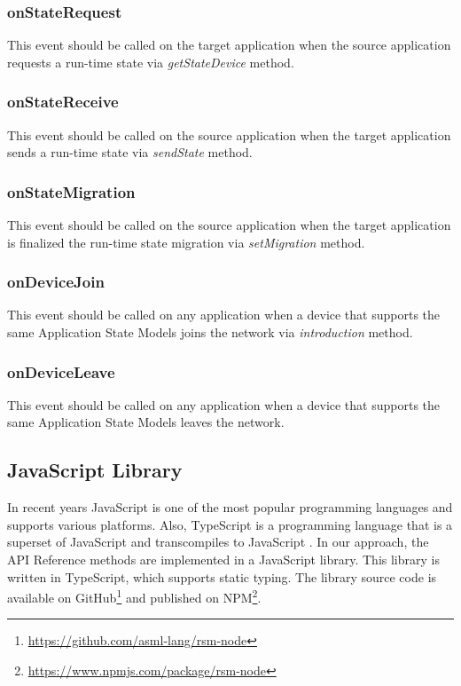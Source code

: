 \subsubsection{onStateRequest}
This event should be called on the target application when the source application requests a run-time state via \textit{getStateDevice} method.

\subsubsection{onStateReceive}
This event should be called on the source application when the target application sends a run-time state via \textit{sendState} method.

\subsubsection{onStateMigration}
This event should be called on the source application when the target application is finalized the run-time state migration via \textit{setMigration} method.

\subsubsection{onDeviceJoin}
This event should be called on any application when a device that supports the same Application State Models joins the network via \textit{introduction} method.

\subsubsection{onDeviceLeave}
This event should be called on any application when a device that supports the same Application State Models leaves the network.


\subsection{JavaScript Library}
In recent years JavaScript is one of the most popular programming languages and supports various platforms. Also, TypeScript is a programming language that is a superset of JavaScript and transcompiles to JavaScript  \cite{typescript}. In our approach, the API Reference methods are implemented in a JavaScript library. This library is written in TypeScript, which supports static typing. The library source code is available on GitHub\footnote{\url{https://github.com/asml-lang/rsm-node}} and published on NPM\footnote{\url{https://www.npmjs.com/package/rsm-node}}.

